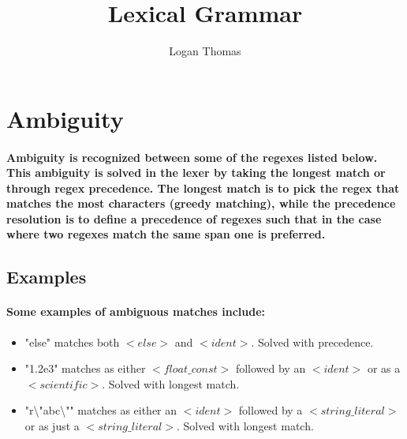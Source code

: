 \documentclass[]{article}
\begin{document}
\title{Lexical Grammar}
\author{Logan Thomas}
\maketitle
\section{Ambiguity}
\paragraph{
    Ambiguity is recognized between some of the regexes listed below.
    This ambiguity is solved in the lexer by taking the longest match or through regex precedence.
    The longest match is to pick the regex that matches the most characters (greedy matching),
    while the precedence resolution is to define a precedence of regexes such that in the case where
    two regexes match the same span one is preferred.
}
\subsection{Examples}
\paragraph{Some examples of ambiguous matches include:}
\begin{itemize}
    \item "else" matches both \begin{math}<else>\end{math} and \begin{math}<ident>\end{math}. Solved with precedence.
    \item "1.2e3" matches as either \begin{math}<float\_const>\end{math} followed by an \begin{math}<ident>\end{math} or as a \begin{math}<scientific>\end{math}. Solved with longest match.
    \item "r\textbackslash"abc\textbackslash"" matches as either an \begin{math}<ident>\end{math} followed by a \begin{math}<string\_literal>\end{math} or as just a \begin{math}<string\_literal>\end{math}. Solved with longest match.
\end{itemize}
\end{document}
